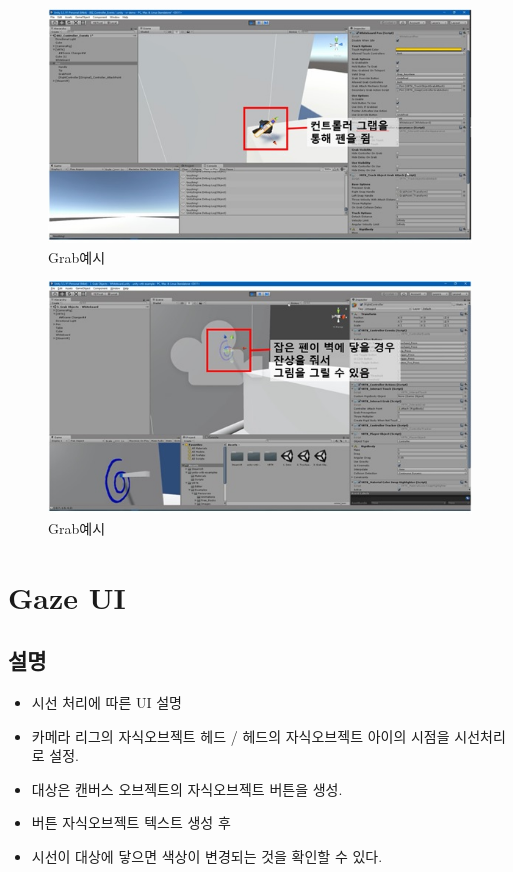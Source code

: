 \documentclass{report}
\begin{document}
    \begin{figure}[h!]
    \centering
    \includegraphics[width=1.0\textwidth]{vrtk3-1.jpg}
    \caption{Grab예시}
    \end{figure}
    
    \begin{figure}[h!]
    \centering
    \includegraphics[width=1.0\textwidth]{vrtk3-2.jpg}
    \caption{Grab예시}
    \end{figure}
    

    \section{Gaze UI}
    \subsection{설명}
    
    \begin{itemize}
    
    \item 시선 처리에 따른 UI 설명
    \item 카메라 리그의 자식오브젝트 헤드 / 헤드의 자식오브젝트 아이의 시점을 시선처리로 설정.

    \item 대상은 캔버스 오브젝트의 자식오브젝트 버튼을 생성.
    \item 버튼 자식오브젝트 텍스트 생성 후
    \item 시선이 대상에 닿으면 색상이 변경되는 것을 확인할 수 있다.




    \end{itemize}
    
\end{document}
